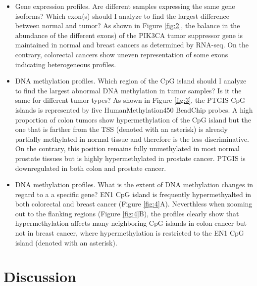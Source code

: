 \documentclass{bmcart}
\begin{document}
\begin{itemize}
\item Gene expression profiles. Are different samples expressing the same gene isoforms? Which exon(s) should I analyze to find the largest difference between normal and tumor? As shown in Figure \ref{fig:2}, the balance in the abundance of the different exons) of the PIK3CA tumor suppressor gene is maintained in normal and breast cancers as determined by RNA-seq. On the contrary, colorectal cancers show uneven representation of some exons indicating heterogeneous profiles.
\item DNA methylation profiles. Which region of the CpG island should I analyze to find the largest abnormal DNA methylation in tumor samples? Is it the same for different tumor types? As shown in Figure \ref{fig:3}, the PTGIS CpG islands is represented by five HumanMethylation450 BeadChip probes. A high proportion of colon tumors show hypermethylation of the CpG island but the one that is farther from the TSS (denoted with an asterisk) is already partially methylated in normal tissue and therefore is the less discriminative. On the contrary, this position remains fully unmethylated in most normal prostate tissues but is highly hypermethylated in prostate cancer. PTGIS is downregulated in both colon and prostate cancer.
\item DNA methylation profiles. What is the extent of DNA methylation changes in regard to a a specific gene? EN1 CpG island is frequently hypermethyalted in both colorectal and breast cancer (Figure \ref{fig:4}A). Neverthless when zooming out to the flanking regions (Figure \ref{fig:4}B), the profiles clearly show that hypermethylation affects many neighboring CpG islands in colon cancer but not in breast cancer, where hypermethylation is restricted to the EN1 CpG island (denoted with an asterisk).

\end{itemize}

\section*{Discussion}
\end{document}
